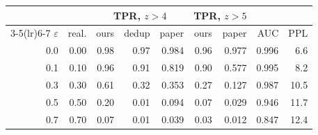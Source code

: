 \begin{tabular}{@{}r r rrr rr r r@{}}
\toprule
 & & \multicolumn{3}{c}{TPR, $z>4$} & \multicolumn{2}{c}{TPR, $z>5$} & & \\
\cmidrule(lr){3-5}\cmidrule(lr){6-7}
$\varepsilon$ & real. & ours & dedup & paper & ours & paper & AUC & PPL \\
\midrule
0.0 & 0.00 & 0.98 & 0.97 & 0.984 & 0.96 & 0.977 & 0.996 & 6.6 \\
0.1 & 0.10 & 0.96 & 0.91 & 0.819 & 0.90 & 0.577 & 0.995 & 8.2 \\
0.3 & 0.30 & 0.61 & 0.32 & 0.353 & 0.27 & 0.127 & 0.987 & 10.5 \\
0.5 & 0.50 & 0.20 & 0.01 & 0.094 & 0.07 & 0.029 & 0.946 & 11.7 \\
0.7 & 0.70 & 0.07 & 0.01 & 0.039 & 0.03 & 0.012 & 0.847 & 12.4 \\
\bottomrule
\end{tabular}